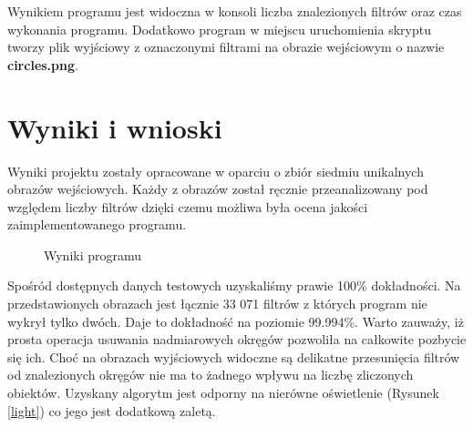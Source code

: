 \documentclass[12pt]{article}
\begin{document}
Wynikiem programu jest widoczna w konsoli liczba znalezionych filtrów oraz czas wykonania programu. Dodatkowo program w miejscu uruchomienia skryptu tworzy plik wyjściowy z oznaczonymi filtrami na obrazie wejściowym o nazwie \textbf{circles.png}.

\section{Wyniki i wnioski}
Wyniki projektu zostały opracowane w oparciu o zbiór siedmiu unikalnych obrazów wejściowych. Każdy z obrazów został ręcznie przeanalizowany pod względem liczby filtrów dzięki czemu możliwa była ocena jakości zaimplementowanego programu.

\begin{figure}[H]%
\centering
{}%
\qquad
{}%
\qquad
{}%
\qquad
{}%
\qquad
{}%
\qquad
{}%
\qquad
{}%

\caption{Wyniki programu}
\label{results1}
\end{figure}

Spośród dostępnych danych testowych uzyskaliśmy prawie 100\% dokładności. Na przedstawionych obrazach jest łącznie 33 071 filtrów z których program nie wykrył tylko dwóch. Daje to dokładność na poziomie 99.994\%. Warto zauważy, iż prosta operacja usuwania nadmiarowych okręgów pozwoliła na całkowite pozbycie się ich. Choć na obrazach wyjściowych widoczne są delikatne przesunięcia filtrów od znalezionych okręgów nie ma to żadnego wpływu na liczbę zliczonych obiektów. Uzyskany algorytm jest odporny na nierówne oświetlenie (Rysunek \ref{light}) co jego jest dodatkową zaletą. 
\end{document}
